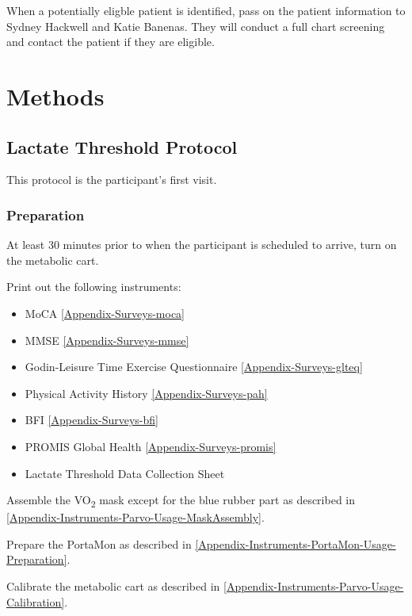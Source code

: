 \documentclass[
]{book}
\providecommand{\tightlist}{%
  \setlength{\itemsep}{0pt}\setlength{\parskip}{0pt}}
\begin{document}
When a potentially eligble patient is identified, pass on the patient information to Sydney Hackwell and Katie Banenas. They will conduct a full chart screening and contact the patient if they are eligible.

\hypertarget{Methods}{%
\chapter{Methods}\label{Methods}}

\hypertarget{Methods-LT}{%
\section{Lactate Threshold Protocol}\label{Methods-LT}}

This protocol is the participant's first visit.

\hypertarget{Methods-LT-prep}{%
\subsection{Preparation}\label{Methods-LT-prep}}

At least 30 minutes prior to when the participant is scheduled to arrive, turn on the metabolic cart.

Print out the following instruments:

\begin{itemize}
\tightlist
\item
  MoCA \ref{Appendix-Surveys-moca}
\item
  MMSE \ref{Appendix-Surveys-mmse}
\item
  Godin-Leisure Time Exercise Questionnaire \ref{Appendix-Surveys-glteq}
\item
  Physical Activity History \ref{Appendix-Surveys-pah}
\item
  BFI \ref{Appendix-Surveys-bfi}
\item
  PROMIS Global Health \ref{Appendix-Surveys-promis}
\item
  Lactate Threshold Data Collection Sheet
\end{itemize}

Assemble the VO\textsubscript{2} mask except for the blue rubber part as described in \ref{Appendix-Instruments-Parvo-Usage-MaskAssembly}.

Prepare the PortaMon as described in \ref{Appendix-Instruments-PortaMon-Usage-Preparation}.

Calibrate the metabolic cart as described in \ref{Appendix-Instruments-Parvo-Usage-Calibration}.
\end{document}
